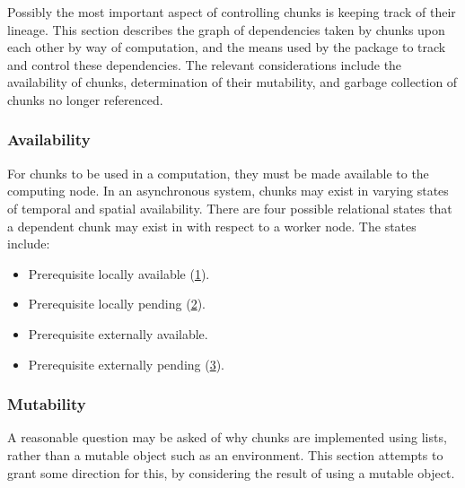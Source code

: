 Possibly the most important aspect of controlling chunks is keeping track of their lineage.
This section describes the graph of dependencies taken by chunks upon each other by way of computation, and the means used by the  package to track and control these dependencies.
The relevant considerations include the availability of chunks, determination of their mutability, and garbage collection of chunks no longer referenced.

\subsubsection{Availability}

For chunks to be used in a computation, they must be made available to the computing node.
In an asynchronous system, chunks may exist in varying states of temporal and spatial availability.
There are four possible relational states that a dependent chunk may exist in with respect to a worker node.
The states include:

\begin{itemize}
\item Prerequisite locally available (\cref{fig:comm-la}).
\item Prerequisite locally pending (\cref{fig:comm-lp}).
\item Prerequisite externally available.
\item Prerequisite externally pending (\cref{fig:comm-ep}).
\end{itemize}

\begin{figure}

\label{fig:comm-la}
\end{figure}

\begin{figure}

\label{fig:comm-lp}
\end{figure}

\begin{figure}

\label{fig:comm-ep}
\end{figure}

\subsubsection{Mutability}

A reasonable question may be asked of why chunks are implemented using lists, rather than a mutable object such as an environment.
This section attempts to grant some direction for this, by considering the result of using a mutable object.

